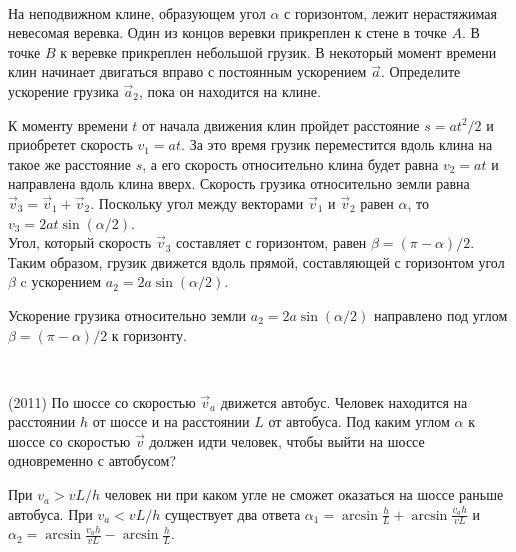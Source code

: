 \begin{ex}
\hspace{0pt} \\
\begin{minipage}{.65\textwidth}
На неподвижном клине, образующем угол $\alpha$  с горизонтом, лежит нерастяжимая невесомая веревка. Один из концов веревки прикреплен к стене в точке $A$. В точке $B$ к веревке прикреплен небольшой грузик. В некоторый момент времени клин начинает двигаться вправо с постоянным ускорением $\vec{a}$. Определите ускорение грузика $\vec{a}_2$, пока он находится на клине.
\end{minipage}
\begin{minipage}{.35\textwidth}
\centering

\end{minipage}
\begin{sol}
К моменту времени $t$ от начала движения клин пройдет расстояние $s = at^2/2$ и приобретет скорость $v_1 = at$. За это время грузик переместится вдоль клина на такое же расстояние $s$, а его скорость относительно клина будет равна $v_2 = at$ и направлена вдоль клина вверх. Скорость грузика относительно земли равна $\vec{v}_3 = \vec{v}_1 + \vec{v}_2$. Поскольку угол между векторами $\vec{v}_1$ и $\vec{v}_2$ равен $\alpha$, то $v_3 = 2at \sin (\alpha /2)$. \\ 
Угол, который скорость $\vec{v}_3$ составляет с горизонтом, равен $\beta  = (\pi - \alpha)/2$. Таким образом, грузик движется вдоль прямой, составляющей с горизонтом угол $\beta$ c ускорением $a_2 = 2a \sin (\alpha /2)$.
\end{sol}
\begin{ans}
Ускорение грузика относительно земли $a_2 = 2a \sin (\alpha /2)$ направлено под углом $\beta  = (\pi - \alpha)/2$ к горизонту.
\end{ans}
\end{ex}

\begin{ex}
\hspace{0pt} \\
\begin{minipage}{.65\textwidth}
(2011) По шоссе со скоростью $\vec{v}_a$ движется автобус. Человек находится на расстоянии $h$ от шоссе и на расстоянии $L$ от автобуса. 
Под каким углом $\alpha$ к шоссе со скоростью $\vec v$  должен идти человек, чтобы выйти на шоссе одновременно с автобусом?
\end{minipage}
\begin{minipage}{.35\textwidth}
\centering

\end{minipage}
\begin{ans}
При $v_a > vL/h$ человек ни при каком угле не сможет оказаться на шоссе раньше автобуса. При $v_a < vL/h$ существует два ответа $\alpha_1 = \arcsin \frac{h}{L} + \arcsin \frac{v_ah}{vL}$ и $\alpha_2 =  \arcsin \frac{v_ah}{vL} - \arcsin \frac{h}{L}$.
\end{ans}
\end{ex}

